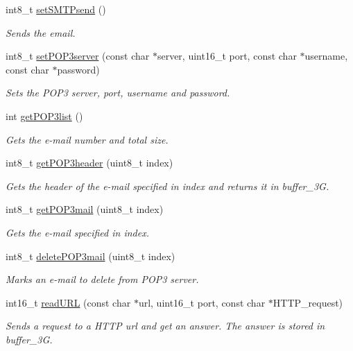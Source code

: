 \begin{DoxyCompactItemize}
int8\+\_\+t \hyperlink{class_wasp3_g_abd0f3c2f3cf69c60974793e51a9412fd}{set\+S\+M\+T\+Psend} ()
\begin{DoxyCompactList}\small\item\em Sends the email. \end{DoxyCompactList}\item 
int8\+\_\+t \hyperlink{class_wasp3_g_a605c5a202aa71efedd88b88a15f6991a}{set\+P\+O\+P3server} (const char $\ast$server, uint16\+\_\+t port, const char $\ast$username, const char $\ast$password)
\begin{DoxyCompactList}\small\item\em Sets the P\+O\+P3 server, port, username and password. \end{DoxyCompactList}\item 
int \hyperlink{class_wasp3_g_a5589e0d4bfaa6638a5b24ff4a4bb60f3}{get\+P\+O\+P3list} ()
\begin{DoxyCompactList}\small\item\em Gets the e-\/mail number and total size. \end{DoxyCompactList}\item 
int8\+\_\+t \hyperlink{class_wasp3_g_a0cb5e82a54dc0616c589e7554aee0c55}{get\+P\+O\+P3header} (uint8\+\_\+t index)
\begin{DoxyCompactList}\small\item\em Gets the header of the e-\/mail specified in index and returns it in \textquotesingle{}buffer\+\_\+3G\textquotesingle{}. \end{DoxyCompactList}\item 
int8\+\_\+t \hyperlink{class_wasp3_g_a42ae31006a539fa852c472a08001c13c}{get\+P\+O\+P3mail} (uint8\+\_\+t index)
\begin{DoxyCompactList}\small\item\em Gets the e-\/mail specified in index. \end{DoxyCompactList}\item 
int8\+\_\+t \hyperlink{class_wasp3_g_a04f4d62492b50983ce0d0a71e62bce28}{delete\+P\+O\+P3mail} (uint8\+\_\+t index)
\begin{DoxyCompactList}\small\item\em Marks an e-\/mail to delete from P\+O\+P3 server. \end{DoxyCompactList}\item 
int16\+\_\+t \hyperlink{class_wasp3_g_a027e8922dc3ee5402d3580777717eea8}{read\+U\+RL} (const char $\ast$url, uint16\+\_\+t port, const char $\ast$H\+T\+T\+P\+\_\+request)
\begin{DoxyCompactList}\small\item\em Sends a request to a H\+T\+TP url and get an answer. The answer is stored in \textquotesingle{}buffer\+\_\+3G\textquotesingle{}. \end{DoxyCompactList}\item 

\end{DoxyCompactItemize}
